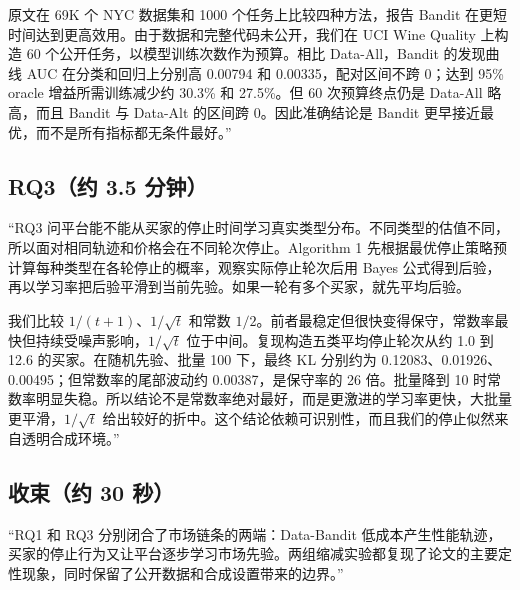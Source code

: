 \documentclass[11pt,a4paper]{ctexart}
\begin{document}
原文在 69K 个 NYC 数据集和 1000 个任务上比较四种方法，报告 Bandit 在更短时间达到更高效用。由于数据和完整代码未公开，我们在 UCI Wine Quality 上构造 60 个公开任务，以模型训练次数作为预算。相比 Data-All，Bandit 的发现曲线 AUC 在分类和回归上分别高 0.00794 和 0.00335，配对区间不跨 0；达到 95\% oracle 增益所需训练减少约 30.3\% 和 27.5\%。但 60 次预算终点仍是 Data-All 略高，而且 Bandit 与 Data-Alt 的区间跨 0。因此准确结论是 Bandit 更早接近最优，而不是所有指标都无条件最好。”

\subsection*{RQ3（约 3.5 分钟）}
“RQ3 问平台能不能从买家的停止时间学习真实类型分布。不同类型的估值不同，所以面对相同轨迹和价格会在不同轮次停止。Algorithm 1 先根据最优停止策略预计算每种类型在各轮停止的概率，观察实际停止轮次后用 Bayes 公式得到后验，再以学习率把后验平滑到当前先验。如果一轮有多个买家，就先平均后验。

我们比较 $1/(t+1)$、$1/\sqrt t$ 和常数 $1/2$。前者最稳定但很快变得保守，常数率最快但持续受噪声影响，$1/\sqrt t$ 位于中间。复现构造五类平均停止轮次从约 1.0 到 12.6 的买家。在随机先验、批量 100 下，最终 KL 分别约为 0.12083、0.01926、0.00495；但常数率的尾部波动约 0.00387，是保守率的 26 倍。批量降到 10 时常数率明显失稳。所以结论不是常数率绝对最好，而是更激进的学习率更快，大批量更平滑，$1/\sqrt t$ 给出较好的折中。这个结论依赖可识别性，而且我们的停止似然来自透明合成环境。”

\subsection*{收束（约 30 秒）}
“RQ1 和 RQ3 分别闭合了市场链条的两端：Data-Bandit 低成本产生性能轨迹，买家的停止行为又让平台逐步学习市场先验。两组缩减实验都复现了论文的主要定性现象，同时保留了公开数据和合成设置带来的边界。”
\end{document}
